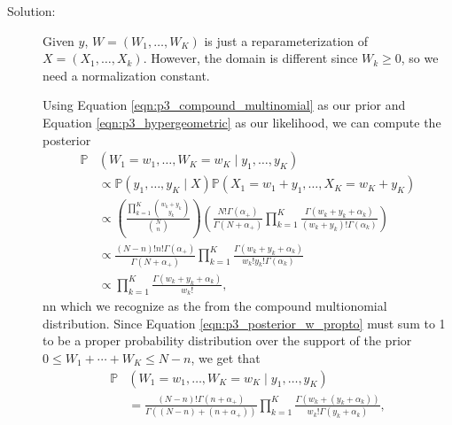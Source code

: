 \documentclass[letterpaper,11pt]{article}
\begin{document}
\begin{enumerate}
\begin{enumerate}
    \begin{description}
    \item[Solution:] Given $y$, $W = \left(W_1,\ldots,W_K\right)$ is just a
      reparameterization of $X = \left(X_1,\ldots,X_k\right)$. However, the
      domain is different since $W_k \geq 0$, so we need a normalization
      constant.

      Using Equation \ref{eqn:p3_compound_multinomial} as our prior and Equation
      \ref{eqn:p3_hypergeometric} as our likelihood, we can compute the posterior
      \begin{align}
        \mathbb{P}
        &\left(
          W_1 = w_1,\ldots,W_K = w_K
          \mid y_1,\ldots,y_K
          \right) \nonumber\\
        &\propto \mathbb{P}\left(
          y_1,\ldots, y_K
          \mid X
          \right)          
        \mathbb{P}\left(
          X_1 = w_1 + y_1,
          \ldots,
          X_K = w_K + y_K
          \right) \nonumber\\
        &\propto
          \left(\frac{\prod_{k=1}^K{w_k + y_k \choose y_k}}{{N \choose n}}\right)
          \left(\frac{N!\Gamma\left(\alpha_+\right)}{\Gamma\left(N + \alpha_+\right)}
          \prod_{k=1}^K\frac{\Gamma\left(w_k + y_k + \alpha_k\right)}{\left(w_k + y_k\right)!\Gamma\left(\alpha_k\right)}\right) \nonumber\\
        &\propto
          \frac{\left(N - n\right)!n!\Gamma\left(\alpha_+\right)}{\Gamma\left(N + \alpha_+\right)}
          \prod_{k=1}^K\frac{\Gamma\left(w_k + y_k + \alpha_k\right)}{w_k!y_k!\Gamma\left(\alpha_k\right)} \nonumber\\
        & \propto \prod_{k=1}^K\frac{\Gamma\left(w_k + y_k + \alpha_k\right)}{w_k!},
          \label{eqn:p3_posterior_w_propto}
      \end{align}nn
      which we recognize as the from the compound multionomial
      distribution. Since Equation \ref{eqn:p3_posterior_w_propto} must sum to 1
      to be a proper probability distribution over the support of the prior
      $0 \leq W_1 + \cdots + W_K \leq N - n$, we get that      
      \begin{align}
        \mathbb{P}
        &\left(
          W_1 = w_1,\ldots,W_K = w_K
          \mid y_1,\ldots,y_K
          \right) \nonumber\\
        &= \frac{\left(N - n\right)!\Gamma\left(n + \alpha_+\right)}{\Gamma\left(\left(N - n\right) + \left(n + \alpha_+\right)\right)}
          \prod_{k=1}^K\frac{\Gamma\left(w_k + \left(y_k + \alpha_k\right)\right)}{w_k!\Gamma\left(y_k + \alpha_k\right)},

\end{align}
\end{description}
\end{enumerate}
\end{enumerate}
\end{document}

